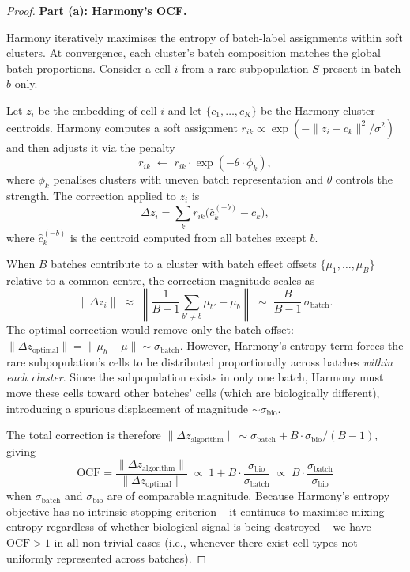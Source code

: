 \documentclass[10pt]{article}
\begin{document}
\begin{proof}
\textbf{Part (a): Harmony's OCF.}

Harmony iteratively maximises the entropy of batch-label assignments within
soft clusters.  At convergence, each cluster's batch composition matches
the global batch proportions.  Consider a cell $i$ from a rare
subpopulation $S$ present in batch $b$ only.

Let $z_i$ be the embedding of cell $i$ and let $\{c_1,\dots,c_K\}$ be the
Harmony cluster centroids.  Harmony computes a soft assignment
$r_{ik} \propto \exp(-\|z_i - c_k\|^2 / \sigma^2)$ and then adjusts it
via the penalty
\[
    r_{ik} \;\leftarrow\; r_{ik}\cdot\exp(-\theta \cdot \phi_k),
\]
where $\phi_k$ penalises clusters with uneven batch representation and
$\theta$ controls the strength.  The correction applied to $z_i$ is
\[
    \Delta z_i = \sum_k r_{ik}\bigl(\hat{c}_k^{(-b)} - c_k\bigr),
\]
where $\hat{c}_k^{(-b)}$ is the centroid computed from all batches except
$b$.

When $B$ batches contribute to a cluster with batch effect offsets
$\{\mu_1,\dots,\mu_B\}$ relative to a common centre, the correction
magnitude scales as
\[
    \|\Delta z_i\|
    \;\approx\; \left\|\frac{1}{B-1}\sum_{b'\ne b}\mu_{b'} - \mu_b\right\|
    \;\sim\; \frac{B}{B-1}\,\sigma_{\mathrm{batch}}.
\]
The optimal correction would remove only the batch offset:
$\|\Delta z_{\mathrm{optimal}}\| = \|\mu_b - \bar\mu\| \sim \sigma_{\mathrm{batch}}$.
However, Harmony's entropy term forces the rare subpopulation's cells to
be distributed proportionally across batches \emph{within each cluster}.
Since the subpopulation exists in only one batch, Harmony must move these
cells toward other batches' cells (which are biologically different),
introducing a spurious displacement of magnitude
$\sim\sigma_{\mathrm{bio}}$.

The total correction is therefore
$\|\Delta z_{\mathrm{algorithm}}\| \sim \sigma_{\mathrm{batch}} + B \cdot
\sigma_{\mathrm{bio}}/(B-1)$, giving
\[
    \mathrm{OCF}
    = \frac{\|\Delta z_{\mathrm{algorithm}}\|}{\|\Delta z_{\mathrm{optimal}}\|}
    \;\propto\; 1 + B\cdot\frac{\sigma_{\mathrm{bio}}}{\sigma_{\mathrm{batch}}}
    \;\propto\; B\cdot\frac{\sigma_{\mathrm{batch}}}{\sigma_{\mathrm{bio}}}
\]
when $\sigma_{\mathrm{batch}}$ and $\sigma_{\mathrm{bio}}$ are of
comparable magnitude.  Because Harmony's entropy objective has no
intrinsic stopping criterion -- it continues to maximise mixing entropy
regardless of whether biological signal is being destroyed -- we have
$\mathrm{OCF} > 1$ in all non-trivial cases (i.e., whenever there exist
cell types not uniformly represented across batches).


\end{proof}
\end{document}

